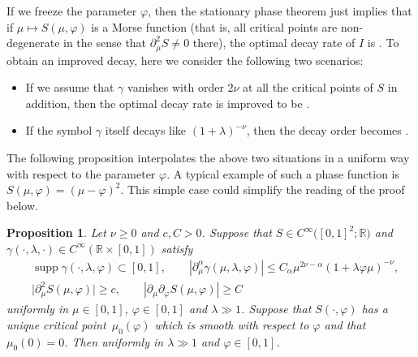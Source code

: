 \documentclass[pdftex]{sigma}
\numberwithin{equation}{section}
\newtheorem{Proposition}[Theorem]{Proposition}
 { \theoremstyle{definition}
\newtheorem{Definition}[Theorem]{Definition}
\newtheorem{Note}[Theorem]{Note}
\newtheorem{Example}[Theorem]{Example}
\newtheorem{Remark}[Theorem]{Remark} }
\def\R{\mathbb{R}}%
\DeclareMathOperator{\supp}{supp}%
\def\a{\alpha}
\def\c{\gamma}
\def\f{\varphi}
\def\l{\lambda}
\def\m{\mu}
\def\n{\nu}
\def\pa{\partial}
\begin{document}
If we freeze the parameter $\f$, then the stationary phase theorem just implies that if $\m\mapsto S(\m,\f)$ is a Morse function (that is, all critical points are non-degenerate in the sense that $\pa_{\m}^2S\neq 0$ there), the optimal decay rate of $I$ is \smash{$\l^{-\frac{1}{2}}$}. To obtain an improved decay, here we consider the following two scenarios:
\begin{itemize}\itemsep=0pt
\item If we assume that $\c$ vanishes with order $2\n$ at all the critical points of $S$ in addition, then the optimal decay rate is improved to be \smash{$\l^{-\frac{1}{2}-\n}$}.
\item If the symbol $\c$ itself decays like $(1+\l)^{-\n}$, then the decay order becomes \smash{$\l^{-\frac{1}{2}-\n}$}.
\end{itemize}
The following proposition interpolates the above two situations in a uniform way with respect to the parameter $\f$.
A typical example of such a phase function is $S(\m,\f)=(\m-\f)^2$. This simple case could simplify the reading of the proof below.

\begin{Proposition}\label{Stphasemovecrit}
Let $\n\geq 0$ and $c, C>0$. Suppose that $S\in C^{\infty}\bigl([0,1]^2;\R\bigr)$ and $\c(\cdot,\l,\cdot)\in C^{\infty}(\R\times [0,1])$ satisfy
\begin{align*}
&\supp \c(\cdot,\l,\f)\subset [0,1],\qquad |\pa_{\m}^{\a}\c(\m,\l,\f)|\leq C_{\a}\m^{2\n-\a}(1+\l \f\m)^{-\n},\\
&
\big|\pa_{\m}^2S(\m,\f)\big|\geq c,\qquad |\pa_{\m}\pa_{\f}S(\m,\f)|\geq C%
\end{align*}
uniformly in $\m\in [0,1]$, $\f\in [0,1]$ and $\l\gg 1$. Suppose that $S(\cdot,\f)$ has a unique critical point~${\m_0(\f)}$ which is smooth with respect to $\f$ and that $\m_0(0)=0$. Then
 \smash{$|I(\l,\f)|\lesssim \l^{-\n-\frac{1}{2}}$} uniformly in $\l\gg 1$ and $\f\in [0,1]$.
\end{Proposition}
\end{document}
